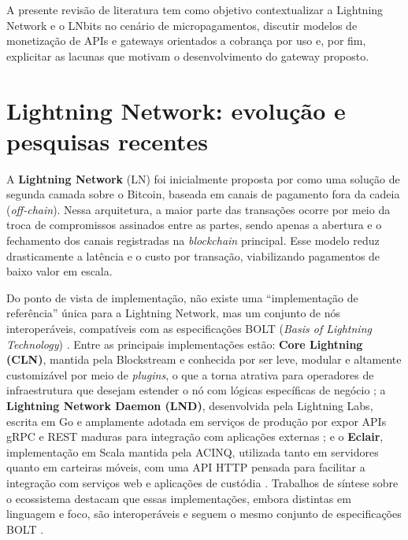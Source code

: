 \documentclass[openright]{normas-utf-tex}
\begin{document}
A presente revisão de literatura tem como objetivo contextualizar a Lightning Network e o LNbits no cenário de micropagamentos, discutir modelos de monetização de APIs e gateways orientados a cobrança por uso e, por fim, explicitar as lacunas que motivam o desenvolvimento do gateway proposto.

\section{Lightning Network: evolução e pesquisas recentes}

A \textbf{Lightning Network} (LN) foi inicialmente proposta por  como uma solução de segunda camada sobre o Bitcoin, baseada em canais de pagamento fora da cadeia (\textit{off-chain}). Nessa arquitetura, a maior parte das transações ocorre por meio da troca de compromissos assinados entre as partes, sendo apenas a abertura e o fechamento dos canais registradas na \textit{blockchain} principal. Esse modelo reduz drasticamente a latência e o custo por transação, viabilizando pagamentos de baixo valor em escala.

Do ponto de vista de implementação, não existe uma “implementação de referência” única para a Lightning Network, mas um conjunto de nós interoperáveis, compatíveis com as especificações BOLT (\textit{Basis of Lightning Technology}) \cite{masteringln}. Entre as principais implementações estão: \textbf{Core Lightning (CLN)}, mantida pela Blockstream e conhecida por ser leve, modular e altamente customizável por meio de \textit{plugins}, o que a torna atrativa para operadores de infraestrutura que desejam estender o nó com lógicas específicas de negócio \cite{clndocs,clnplugins}; a \textbf{Lightning Network Daemon (LND)}, desenvolvida pela Lightning Labs, escrita em Go e amplamente adotada em serviços de produção por expor APIs gRPC e REST maduras para integração com aplicações externas \cite{lnddocs,lndoverview}; e o \textbf{Eclair}, implementação em Scala mantida pela ACINQ, utilizada tanto em servidores quanto em carteiras móveis, com uma API HTTP pensada para facilitar a integração com serviços web e aplicações de custódia \cite{eclairdocs,eclairwallet}. Trabalhos de síntese sobre o ecossistema destacam que essas implementações, embora distintas em linguagem e foco, são interoperáveis e seguem o mesmo conjunto de especificações BOLT \cite{lnimploverview}.
\end{document}
